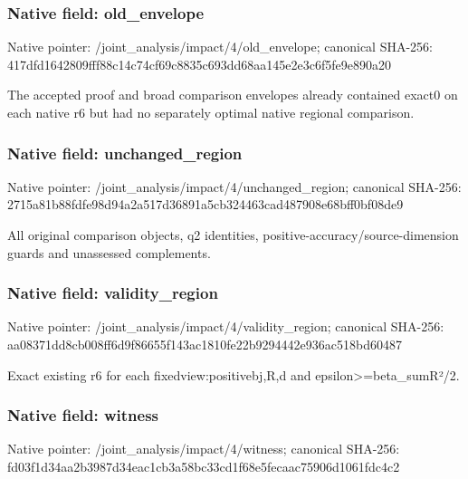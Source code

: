 \documentclass[10pt,a4paper]{article}
\begin{document}
\subsubsection{Native field: old\_\allowbreak{}envelope}
Native pointer: /joint\_\allowbreak{}analysis/impact/4/old\_\allowbreak{}envelope; canonical SHA-256: 417dfd1642809fff88c14c74cf69c8835c693dd68aa145e2e3c6f5fe9e890a20

\begingroup\raggedright\sloppy The accepted proof and broad comparison envelopes already contained exact0 on each native r6 but had no separately optimal native regional comparison.\par\endgroup

\subsubsection{Native field: unchanged\_\allowbreak{}region}
Native pointer: /joint\_\allowbreak{}analysis/impact/4/unchanged\_\allowbreak{}region; canonical SHA-256: 2715a81b88fdfe98d94a2a517d36891a5cb324463cad487908e68bff0bf08de9

\begingroup\raggedright\sloppy All original comparison objects,\allowbreak{} q2 identities,\allowbreak{} positive-accuracy/\allowbreak{}source-dimension guards and unassessed complements.\par\endgroup

\subsubsection{Native field: validity\_\allowbreak{}region}
Native pointer: /joint\_\allowbreak{}analysis/impact/4/validity\_\allowbreak{}region; canonical SHA-256: aa08371dd8cb008ff6d9f86655f143ac1810fe22b9294442e936ac518bd60487

\begingroup\raggedright\sloppy Exact existing r6 for each fixedview:\allowbreak{}positivebj,\allowbreak{}R,\allowbreak{}d and epsilon>=\allowbreak{}beta\_\allowbreak{}sumR{\AtlasUnicodeText ²}\allowbreak{}/\allowbreak{}2.\par\endgroup

\subsubsection{Native field: witness}
Native pointer: /joint\_\allowbreak{}analysis/impact/4/witness; canonical SHA-256: fd03f1d34aa2b3987d34eac1cb3a58bc33cd1f68e5fecaac75906d1061fdc4c2
\end{document}

